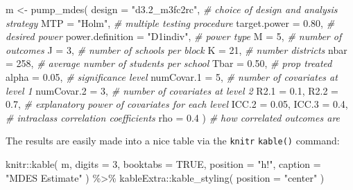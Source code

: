 \documentclass[
]{article}
\newenvironment{Shaded}{\begin{snugshade}}{\end{snugshade}}
\newcommand{\AttributeTok}[1]{\textcolor[rgb]{0.77,0.63,0.00}{#1}}
\newcommand{\CommentTok}[1]{\textcolor[rgb]{0.56,0.35,0.01}{\textit{#1}}}
\newcommand{\ConstantTok}[1]{\textcolor[rgb]{0.00,0.00,0.00}{#1}}
\newcommand{\DecValTok}[1]{\textcolor[rgb]{0.00,0.00,0.81}{#1}}
\newcommand{\FloatTok}[1]{\textcolor[rgb]{0.00,0.00,0.81}{#1}}
\newcommand{\FunctionTok}[1]{\textcolor[rgb]{0.00,0.00,0.00}{#1}}
\newcommand{\NormalTok}[1]{#1}
\newcommand{\OtherTok}[1]{\textcolor[rgb]{0.56,0.35,0.01}{#1}}
\newcommand{\SpecialCharTok}[1]{\textcolor[rgb]{0.00,0.00,0.00}{#1}}
\newcommand{\StringTok}[1]{\textcolor[rgb]{0.31,0.60,0.02}{#1}}
\begin{document}
\begin{Shaded}
\begin{Highlighting}[]
\NormalTok{m }\OtherTok{\textless{}{-}} \FunctionTok{pump\_mdes}\NormalTok{(}
  \AttributeTok{design =} \StringTok{"d3.2\_m3fc2rc"}\NormalTok{,      }\CommentTok{\# choice of design and analysis strategy}
  \AttributeTok{MTP =} \StringTok{"Holm"}\NormalTok{,                 }\CommentTok{\# multiple testing procedure}
  \AttributeTok{target.power =} \FloatTok{0.80}\NormalTok{,          }\CommentTok{\# desired power}
  \AttributeTok{power.definition =} \StringTok{"D1indiv"}\NormalTok{, }\CommentTok{\# power type}
  \AttributeTok{M =} \DecValTok{5}\NormalTok{,                        }\CommentTok{\# number of outcomes}
  \AttributeTok{J =} \DecValTok{3}\NormalTok{,                        }\CommentTok{\# number of schools per block}
  \AttributeTok{K =} \DecValTok{21}\NormalTok{,                       }\CommentTok{\# number districts}
  \AttributeTok{nbar =} \DecValTok{258}\NormalTok{,                   }\CommentTok{\# average number of students per school}
  \AttributeTok{Tbar =} \FloatTok{0.50}\NormalTok{,                  }\CommentTok{\# prop treated}
  \AttributeTok{alpha =} \FloatTok{0.05}\NormalTok{,                 }\CommentTok{\# significance level}
  \AttributeTok{numCovar.1 =} \DecValTok{5}\NormalTok{,               }\CommentTok{\# number of covariates at level 1}
  \AttributeTok{numCovar.2 =} \DecValTok{3}\NormalTok{,               }\CommentTok{\# number of covariates at level 2}
  \AttributeTok{R2.1 =} \FloatTok{0.1}\NormalTok{, }\AttributeTok{R2.2 =} \FloatTok{0.7}\NormalTok{,       }\CommentTok{\# explanatory power of covariates for each level}
  \AttributeTok{ICC.2 =} \FloatTok{0.05}\NormalTok{, }\AttributeTok{ICC.3 =} \FloatTok{0.4}\NormalTok{,    }\CommentTok{\# intraclass correlation coefficients}
  \AttributeTok{rho =} \FloatTok{0.4}\NormalTok{ )                   }\CommentTok{\# how correlated outcomes are}
\end{Highlighting}
\end{Shaded}

The results are easily made into a nice table via the \texttt{knitr}
\texttt{kable()} command:

\begin{Shaded}
\begin{Highlighting}[]
\NormalTok{knitr}\SpecialCharTok{::}\FunctionTok{kable}\NormalTok{( m, }\AttributeTok{digits =} \DecValTok{3}\NormalTok{, }\AttributeTok{booktabs =} \ConstantTok{TRUE}\NormalTok{,}
              \AttributeTok{position =} \StringTok{"h!"}\NormalTok{, }\AttributeTok{caption =} \StringTok{"MDES Estimate"}\NormalTok{ ) }\SpecialCharTok{\%\textgreater{}\%}
\NormalTok{  kableExtra}\SpecialCharTok{::}\FunctionTok{kable\_styling}\NormalTok{( }\AttributeTok{position =} \StringTok{"center"}\NormalTok{ )}
\end{Highlighting}
\end{Shaded}
\end{document}
